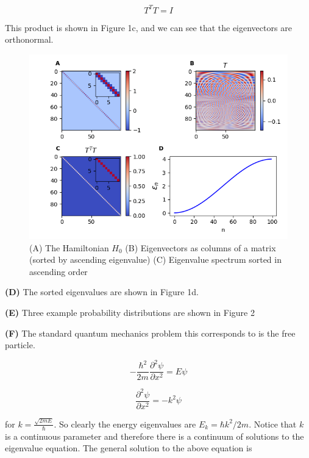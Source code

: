 \documentclass[12pt]{article}
\theoremstyle{definition}
\begin{document}
{\begin{equation*}
T^{T}T = I
\end{equation*}

This product is shown in Figure 1c, and we can see that the eigenvectors are orthonormal.

\begin{figure}[t!]
\centering
\includegraphics[width=15cm]{Figure_1}
\caption{(A) The Hamiltonian $H_{0}$ (B) Eigenvectors as columns of a matrix (sorted by ascending eigenvalue) (C) Eigenvalue spectrum sorted in ascending order}
\label{fig:method}
\end{figure}

\vspace{0.1in}
\noindent \textbf{(D)} The sorted eigenvalues are shown in Figure 1d.

\vspace{0.1in}
\noindent \textbf{(E)} Three example probability distributions are shown in Figure 2



\vspace{0.1in}
\noindent \textbf{(F)} The standard quantum mechanics problem this corresponds to is the free particle.

\begin{equation*}
-\frac{\hbar^{2}}{2m}\frac{\partial^{2}\psi}{\partial x^{2}} = E\psi
\end{equation*}

\begin{equation*}
\frac{\partial^{2}\psi}{\partial x^{2}} = -k^{2}\psi
\end{equation*}

for $k = \frac{\sqrt{2mE}}{\hbar}$. So clearly the energy eigenvalues are $E_{k} = \hbar k^{2}/2m$. Notice that $k$ is a continuous parameter and therefore there is a continuum of solutions to the eigenvalue equation. The general solution to the above equation is

}
\end{document}
